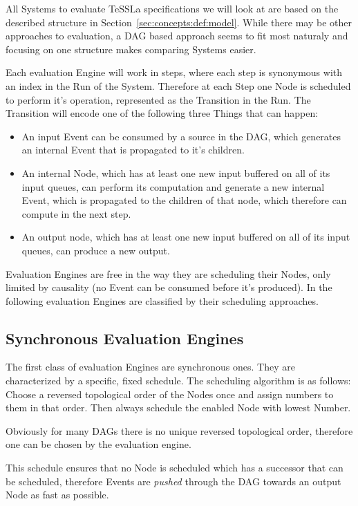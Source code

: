 All Systems to evaluate TeSSLa specifications we will look at are based on the described structure in Section~\ref{sec:concepts:def:model}.
While there may be other approaches to evaluation, a DAG based approach seems to fit most naturaly and focusing on one structure makes comparing Systems easier.

Each evaluation Engine will work in steps, where each step is synonymous with an index in the Run of the System.
Therefore at each Step one Node is scheduled to perform it's operation, represented as the Transition in the Run.
The Transition will encode one of the following three Things that can happen:

\begin{itemize}
  \item An input Event can be consumed by a source in the DAG, which generates an internal Event that is propagated to it's children.
  \item An internal Node, which has at least one new input buffered on all of its input queues, can perform
    its computation and generate a new internal Event, which is propagated to the children of that node, which therefore can compute in the next step.
  \item An output node, which has at least one new input buffered on all of its input queues, can produce a new output.
\end{itemize}

Evaluation Engines are free in the way they are scheduling their Nodes, only limited by causality (no Event can be consumed before it's produced).
In the following evaluation Engines are classified by their scheduling approaches.

\subsection{Synchronous Evaluation Engines}
\label{sec:concepts:behaviour_without_timing:synchronous}

The first class of evaluation Engines are synchronous ones.
They are characterized by a specific, fixed schedule.
The scheduling algorithm is as follows: Choose a reversed topological order of the Nodes once and assign numbers to them in that order.
Then always schedule the enabled Node with lowest Number.

Obviously for many DAGs there is no unique reversed topological order, therefore one can be chosen by the evaluation engine.

This schedule ensures that no Node is scheduled which has a successor that can be scheduled, therefore Events are \emph{pushed} through the DAG towards an output Node as fast as possible.

